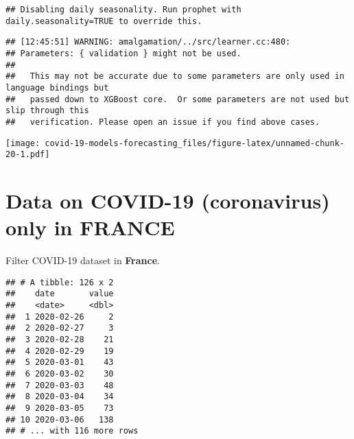 \documentclass[
]{article}
\newenvironment{Shaded}{\begin{snugshade}}{\end{snugshade}}
\newcommand{\CommentTok}[1]{\textcolor[rgb]{0.56,0.35,0.01}{\textit{#1}}}
\newcommand{\DataTypeTok}[1]{\textcolor[rgb]{0.13,0.29,0.53}{#1}}
\newcommand{\DecValTok}[1]{\textcolor[rgb]{0.00,0.00,0.81}{#1}}
\newcommand{\KeywordTok}[1]{\textcolor[rgb]{0.13,0.29,0.53}{\textbf{#1}}}
\newcommand{\NormalTok}[1]{#1}
\newcommand{\OperatorTok}[1]{\textcolor[rgb]{0.81,0.36,0.00}{\textbf{#1}}}
\newcommand{\OtherTok}[1]{\textcolor[rgb]{0.56,0.35,0.01}{#1}}
\newcommand{\StringTok}[1]{\textcolor[rgb]{0.31,0.60,0.02}{#1}}
\begin{document}
\begin{Shaded}
\end{Shaded}

\begin{verbatim}
## Disabling daily seasonality. Run prophet with daily.seasonality=TRUE to override this.
\end{verbatim}

\begin{verbatim}
## [12:45:51] WARNING: amalgamation/../src/learner.cc:480: 
## Parameters: { validation } might not be used.
## 
##   This may not be accurate due to some parameters are only used in language bindings but
##   passed down to XGBoost core.  Or some parameters are not used but slip through this
##   verification. Please open an issue if you find above cases.
\end{verbatim}

\texttt{[image: covid-19-models-forecasting\_files/figure-latex/unnamed-chunk-20-1.pdf]}

\newpage

\hypertarget{data-on-covid-19-coronavirus-only-in-france}{%
\section{Data on COVID-19 (coronavirus) only in
FRANCE}\label{data-on-covid-19-coronavirus-only-in-france}}

Filter COVID-19 dataset in \textbf{France}.

\begin{verbatim}
## # A tibble: 126 x 2
##    date       value
##    <date>     <dbl>
##  1 2020-02-26     2
##  2 2020-02-27     3
##  3 2020-02-28    21
##  4 2020-02-29    19
##  5 2020-03-01    43
##  6 2020-03-02    30
##  7 2020-03-03    48
##  8 2020-03-04    34
##  9 2020-03-05    73
## 10 2020-03-06   138
## # ... with 116 more rows
\end{verbatim}
\end{document}
